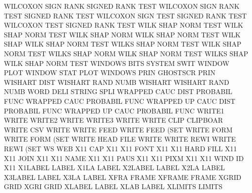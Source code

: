 WILCOXON SIGN RANK                      SIGNED   RANK TEST
WILCOXON SIGN RANK TEST                 SIGNED   RANK TEST
WILCOXON SIGN TEST                      SIGNED   RANK TEST
WILCOXON TEST                           SIGNED   RANK TEST
WILK     SHAP NORM TEST                 WILK     SHAP NORM TEST
WILK     SHAP NORM                      WILK     SHAP NORM TEST
WILK     SHAP                           WILK     SHAP NORM TEST
WILKS    SHAP NORM TEST                 WILK     SHAP NORM TEST
WILKS    SHAP NORM                      WILK     SHAP NORM TEST
WILKS    SHAP                           WILK     SHAP NORM TEST
WINDOWS  BITS                           SYSTEM   SWIT
WINDOW   PLOT                           WINDOW   STAT PLOT
WINDOWS  PRIN                           GHOSTSCR PRIN
WISHART  DIST                           WISHART  RAND NUMB
WISHART                                 WISHART  RAND NUMB
WORD     DELI                           STRING   SPLI
WRAPPED  CAUC DIST                      PROBABIL FUNC
WRAPPED  CAUC                           PROBABIL FUNC
WRAPPED  UP   CAUC DIST                 PROBABIL FUNC
WRAPPED  UP   CAUC                      PROBABIL FUNC
WRITE1                                  WRITE
WRITE2                                  WRITE
WRITE3                                  WRITE
WRITE    CLIP                           CLIPBOAR
WRITE    CSV                            WRITE
WRITE    FEED                           WRITE    FEED (SET
WRITE    FORM                           WRITE    FORM (SET
WRITE    HEAD FILE                      WRITE
WRITE    REWI                           WRITE    REWI (SET
WS                                      WEB
X11      CAP                            X11
X11      FONT                           X11
X11      HARD FILL                      X11
X11      JOIN                           X11
X11      NAME                           X11
X11      PAUS                           X11
X11      PIXM                           X11
X11      WIND ID                        X11
X1LABEL                                 LABEL
X1LA                                    LABEL
X2LABEL                                 LABEL
X2LA                                    LABEL
X3LABEL                                 LABEL
X3LA                                    LABEL
XFRA                                    FRAME
XFRAME                                  FRAME
XGRID                                   GRID
XGRI                                    GRID
XLABEL                                  LABEL
XLAB                                    LABEL
XLIMITS                                 LIMITS
